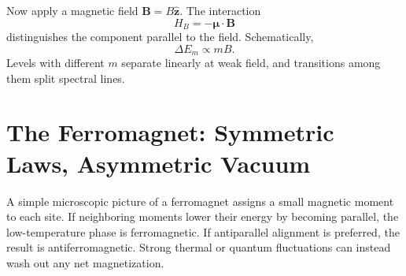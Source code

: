 \begin{classroomqa}
\end{classroomqa}

Now apply a magnetic field \(\mathbf B=B\hat{\mathbf z}\). The interaction
\begin{equation}
H_B=-\boldsymbol{\mu}\cdot\mathbf B
\end{equation}
distinguishes the component parallel to the field. Schematically,
\begin{equation}
\Delta E_m\propto mB.
\label{eq:l9-zeeman}
\end{equation}
Levels with different \(m\) separate linearly at weak field, and transitions among them split spectral lines.

\begin{classroomqa}
\end{classroomqa}

\begin{center}
\end{center}

\section{The Ferromagnet: Symmetric Laws, Asymmetric Vacuum}

A simple microscopic picture of a ferromagnet assigns a small magnetic moment to each site. If neighboring moments lower their energy by becoming parallel, the low-temperature phase is ferromagnetic. If antiparallel alignment is preferred, the result is antiferromagnetic. Strong thermal or quantum fluctuations can instead wash out any net magnetization.

